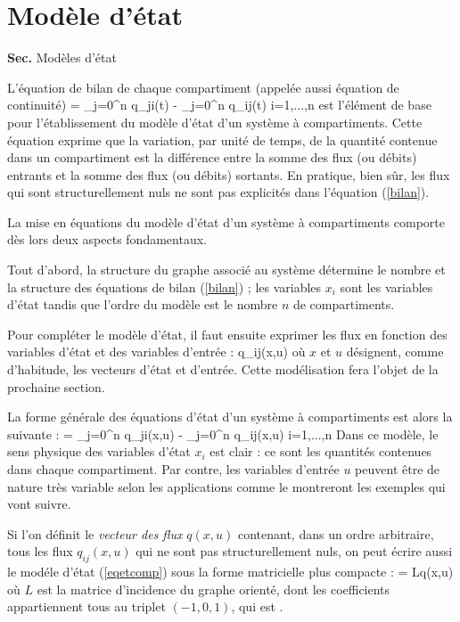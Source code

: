 \section{Modèle d'état}
 {{ \bf Sec. \thesection} \hfill
Modèles d'état \hspace*{5mm}}

L'équation de bilan de chaque compartiment (appelée aussi équation de
continuité)
\eqnn
{} = \sum_{j=0}^n q_{ji}(t) - \sum_{j=0}^n q_{ij}(t) \hspace{1cm} i=1,...,n
\label{bilan}
\eeqnn
est l'élément de base pour l'établissement du modèle d'état d'un système
à compartiments. Cette équation exprime que la variation, par 
unité de temps,  de la 
quantité contenue dans un
compartiment est la différence entre la somme des
flux (ou débits) entrants et la somme des flux (ou débits) 
sortants. En pratique, bien s\^ur, les flux qui sont structurellement nuls 
ne sont pas explicités dans l'équation (\ref{bilan}).

La mise en équations du modèle d'état d'un système à compartiments
comporte dès lors deux aspects fondamentaux.

Tout d'abord, la structure du graphe associé au système détermine le nombre
et la structure des équations de bilan (\ref{bilan}) ; les variables $x_i$ sont
les variables d'état tandis que l'ordre du modèle est le nombre $n$ de 
compartiments.

Pour compléter le modèle d'état, il faut ensuite exprimer les flux
en fonction des variables d'état et des variables d'entrée :
\eqnn
q_{ij}(x,u)
\eeqnn
où $x$ et $u$ désignent, comme d'habitude, les vecteurs d'état et 
d'entrée. Cette modélisation fera l'objet de la prochaine section.

La forme générale des équations d'état d'un système à compartiments
est alors la suivante :
\eqnn
{} = \sum_{j=0}^n q_{ji}(x,u) - \sum_{j=0}^n q_{ij}(x,u) \hspace{1cm} i=1,...,n \label{eqetcomp}
\eeqnn
Dans ce modèle, le sens physique des variables d'état $x_i$ est clair : ce sont
les quantités contenues dans chaque compartiment. Par contre, les variables
d'entrée $u$ peuvent être de nature très variable selon les applications comme le montreront les exemples qui vont suivre.

Si l'on définit le {\em vecteur des flux} $q(x,u)$ contenant, dans un ordre arbitraire, 
tous les flux $q_{ij}(x,u)$
qui ne sont pas structurellement nuls, on peut écrire aussi le modéle d'état
(\ref{eqetcomp}) sous la forme matricielle plus compacte :
\eqn
{} = Lq(x,u) \label{modetcomp}
\eeqn
où $L$ est la matrice d'incidence du graphe orienté, dont les coefficients appartiennent tous au triplet
$(-1,0,1)$, qui est .

